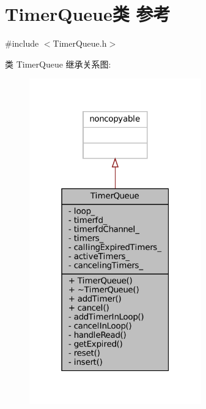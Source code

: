 \hypertarget{classmuduo_1_1TimerQueue}{}\section{Timer\+Queue类 参考}
\label{classmuduo_1_1TimerQueue}


{\ttfamily \#include $<$Timer\+Queue.\+h$>$}



类 Timer\+Queue 继承关系图\+:
\nopagebreak
\begin{figure}[H]
\begin{center}
\leavevmode
\includegraphics[width=211pt]{classmuduo_1_1TimerQueue__inherit__graph}
\end{center}
\end{figure}


